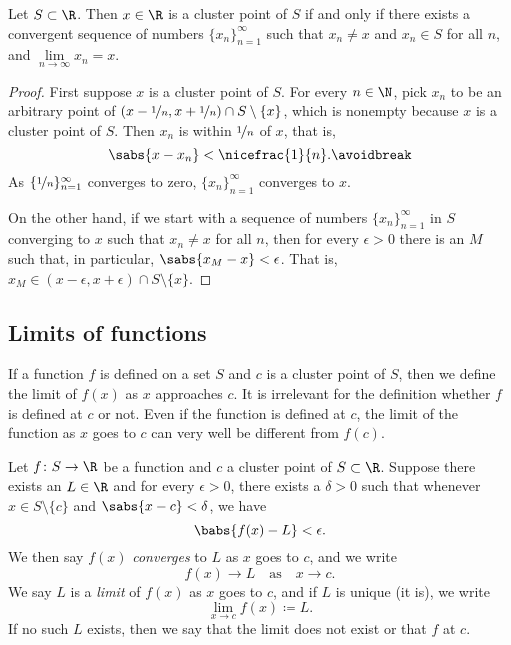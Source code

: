 \begin{prop}
Let $S \subset \R$.  Then $x \in \R$ is a cluster point of $S$
if and only if
there exists a convergent sequence of numbers $\{ x_n \}_{n=1}^\infty$ such that
$x_n \not= x$ and $x_n \in S$ for all $n$, and $\lim\limits_{n\to\infty} x_n = x$.
\end{prop}

\begin{proof}
First suppose $x$ is a cluster point of $S$.
For every $n \in \N$, pick $x_n$ to be an arbitrary point of
$(x-\nicefrac{1}{n},x+\nicefrac{1}{n}) \cap S \setminus \{x\}$, which
is nonempty because $x$ is a cluster point of $S$.
Then
$x_n$ is within $\nicefrac{1}{n}$ of $x$, that is,
\begin{equation*}
\sabs{x-x_n} < \nicefrac{1}{n} .
\avoidbreak
\end{equation*}
As $\{ \nicefrac{1}{n} \}_{n=1}^\infty$ converges to zero,
$\{ x_n \}_{n=1}^\infty$ converges to $x$.

On the other hand, if we start with a sequence of numbers
$\{ x_n \}_{n=1}^\infty$ in $S$
converging to $x$ such that $x_n \not= x$ for all $n$, then for every
$\epsilon > 0$ there is an $M$ such that, in particular, $\sabs{x_M - x} <
\epsilon$.  That is, $x_M \in (x-\epsilon,x+\epsilon) \cap S \setminus \{x\}$.
\end{proof}

\subsection{Limits of functions}

If a function $f$ is defined on a set $S$ and $c$ is a cluster point of $S$,
then we define the limit of $f(x)$ as $x$ approaches $c$.  
It is irrelevant for the definition whether $f$ is defined at $c$ or not.
Even if the function is defined at $c$, the limit of the
function as $x$ goes to $c$ can very well be different
from $f(c)$.

\begin{defn}
%
Let $f \colon S \to \R$ be a function and $c$ a cluster point of
$S \subset \R$.
Suppose there exists an $L \in \R$ and for every $\epsilon > 0$,
there exists a $\delta > 0$ such that whenever $x \in S \setminus \{ c \}$
and $\sabs{x - c} < \delta$, we have
\begin{equation*}
\babs{f(x) - L} < \epsilon .
\end{equation*}
We then say $f(x)$ \emph{converges} to $L$ as $x$ goes
to $c$, and we write
%
\begin{equation*}
f(x) \to L \quad\text{as}\quad x \to c .
\end{equation*}
We say $L$ is a \emph{limit} of $f(x)$ as $x$
goes to $c$, and if $L$ is unique (it is), we write
%
\begin{equation*}
\lim_{x \to c} f(x) \coloneqq L .
\end{equation*}
If no such $L$ exists, then we say that the limit does not exist or
that $f$ \emph{} at $c$.
\end{defn}

